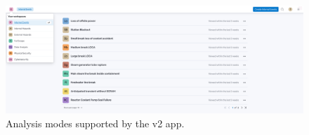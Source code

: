 \begin{figure}
  \centering
  \includegraphics[width=1.0\textwidth]{4_proposed_solution/web_app/figures/analysis_modes.png}
  \caption{Analysis modes supported by the v2 app.}
  \label{fig:analysis_modes}
\end{figure}